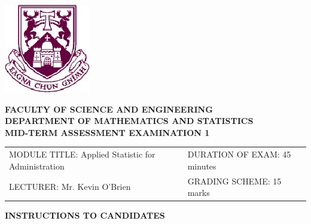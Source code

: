 \documentclass[a4paper,12pt]{article}
\begin{document}
\begin{center}
	\includegraphics[scale=0.60]{images/shieldtransparent2}
\end{center}

\begin{center}
	\vspace{1cm}
	\large \bf {FACULTY OF SCIENCE AND ENGINEERING} \\[0.5cm]
	\normalsize DEPARTMENT OF MATHEMATICS AND STATISTICS \\[1.25cm]
	\large \bf {MID-TERM ASSESSMENT EXAMINATION 1} \\[1.0cm]
\end{center}

\begin{tabular}{ll}
	MODULE TITLE: Applied Statistic for Administration  & DURATION OF EXAM: 45 minutes \\[1cm]
	LECTURER: Mr. Kevin O'Brien & GRADING SCHEME: 15 marks \\
\end{tabular}
\bigskip
\begin{center}
	{\bf INSTRUCTIONS TO CANDIDATES}
\end{center}
\end{document}
